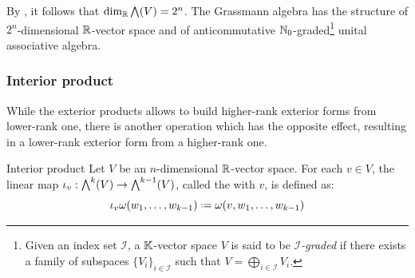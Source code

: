 By , it follows that $ \dim_{\mathbb{R}} \bigwedge(V) = 2^n $. The Grassmann algebra has the structure of $ 2^n $-dimensional $ \mathbb{R} $-vector space and of anticommutative $ \mathbb{N}_0 $-graded\footnote{Given an index set $ \mathcal{I} $, a $ \mathbb{K} $-vector space $ V $ is said to be \emph{$ \mathcal{I} $-graded} if there exists a family of subspaces $ \{V_i\}_{i \in \mathcal{I}} $ such that $ V = \bigoplus_{i \in \mathcal{I}} V_i $.} unital associative algebra\footnotemark.


\subsubsection{Interior product}

While the exterior products allows to build higher-rank exterior forms from lower-rank one, there is another operation which has the opposite effect, resulting in a lower-rank exterior form from a higher-rank one.

\begin{definition}{Interior product}{}
  Let $ V $ be an $ n $-dimensional $ \mathbb{R} $-vector space. For each $ v \in V $, the linear map $ \iota_v : {\bigwedge}^{k}(V) \rightarrow {\bigwedge}^{k-1}(V) $, called the  with $ v $, is defined as:
  \begin{equation}
    \ip_v \omega(w_1 , \dots , w_{k-1}) \defeq \omega(v , w_1 , \dots , w_{k-1})
  \end{equation}
\end{definition}

